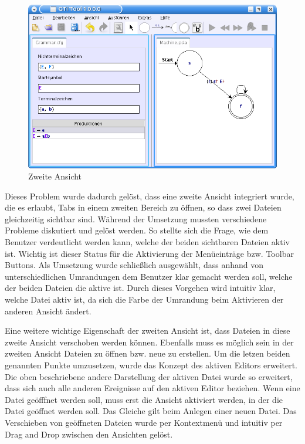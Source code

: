\begin{figure}[h!]
\begin{center}
\includegraphics[width=12cm]{../images/second_view.png}
\caption{Zweite Ansicht}
\end{center}
\end{figure}
\vspace{10pt}

Dieses Problem wurde dadurch gelöst, dass eine zweite Ansicht integriert wurde,
die es erlaubt, Tabs in einem zweiten Bereich zu öffnen, so dass zwei Dateien
gleichzeitig sichtbar sind. Während der Umsetzung mussten verschiedene Probleme
diskutiert und gelöst werden. So stellte sich die Frage, wie dem Benutzer
verdeutlicht werden kann, welche der beiden sichtbaren Dateien aktiv ist.
Wichtig ist dieser Status für die Aktivierung der Menüeinträge bzw. Toolbar
Buttons. Als Umsetzung wurde schließlich ausgewählt, dass anhand von
unterschiedlichen Umrandungen dem Benutzer klar gemacht werden soll, welche der
beiden Dateien die aktive ist. Durch dieses Vorgehen wird intuitiv klar, welche
Datei aktiv ist, da sich die Farbe der Umrandung beim Aktivieren der anderen
Ansicht ändert.\vspace{10pt}

Eine weitere wichtige Eigenschaft der zweiten Ansicht ist, dass Dateien in diese
zweite Ansicht verschoben werden können. Ebenfalls muss es möglich sein in der
zweiten Ansicht Dateien zu öffnen bzw. neue zu erstellen. Um die letzen beiden
genannten Punkte umzusetzen, wurde das Konzept des aktiven Editors erweitert. Die
oben beschriebene andere Darstellung der aktiven Datei wurde so erweitert, dass
sich auch alle anderen Ereignisse auf den aktiven Editor beziehen. Wenn eine
Datei geöfffnet werden soll, muss erst die Ansicht aktiviert werden, in der die
Datei geöffnet werden soll. Das Gleiche gilt beim Anlegen einer neuen Datei. Das
Verschieben von geöffneten Dateien wurde per Kontextmenü und intuitiv per Drag
and Drop zwischen den Ansichten gelöst.\vspace{10pt}
